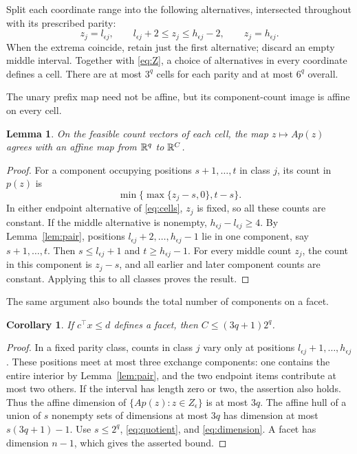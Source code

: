 \documentclass[11pt]{article}
\newtheorem{lemma}[theorem]{Lemma}
\newtheorem{corollary}[theorem]{Corollary}
\begin{document}
Split each coordinate range into the following alternatives, intersected throughout with its prescribed parity:
\begin{equation}\label{eq:cells}
 z_j=l_{\epsilon j},\qquad
 l_{\epsilon j}+2\le z_j\le h_{\epsilon j}-2,\qquad
 z_j=h_{\epsilon j}.
\end{equation}
When the extrema coincide, retain just the first alternative; discard an empty middle interval. Together with \eqref{eq:Z}, a choice of alternatives in every coordinate defines a cell. There are at most $3^q$ cells for each parity and at most $6^q$ overall.

The unary prefix map need not be affine, but its component-count image is affine on every cell.
\begin{lemma}\label{lem:affine}
On the feasible count vectors of each cell, the map $z\mapsto Ap(z)$ agrees with an affine map from $\mathbb R^q$ to $\mathbb R^C$.
\end{lemma}
\begin{proof}
For a component occupying positions $s+1,\ldots,t$ in class $j$, its count in $p(z)$ is
\[
 \min\{\max\{z_j-s,0\},t-s\}.
\]
In either endpoint alternative of \eqref{eq:cells}, $z_j$ is fixed, so all these counts are constant. If the middle alternative is nonempty, $h_{\epsilon j}-l_{\epsilon j}\ge4$. By Lemma~\ref{lem:pair}, positions $l_{\epsilon j}+2,\ldots,h_{\epsilon j}-1$ lie in one component, say $s+1,\ldots,t$. Then $s\le l_{\epsilon j}+1$ and $t\ge h_{\epsilon j}-1$. For every middle count $z_j$, the count in this component is $z_j-s$, and all earlier and later component counts are constant. Applying this to all classes proves the result.
\end{proof}

The same argument also bounds the total number of components on a facet.
\begin{corollary}\label{cor:C}
If $c^\top x\le d$ defines a facet, then $C\le(3q+1)2^q$.
\end{corollary}
\begin{proof}
In a fixed parity class, counts in class $j$ vary only at positions $l_{\epsilon j}+1,\ldots,h_{\epsilon j}$. These positions meet at most three exchange components: one contains the entire interior by Lemma~\ref{lem:pair}, and the two endpoint items contribute at most two others. If the interval has length zero or two, the assertion also holds. Thus the affine dimension of $\{Ap(z):z\in Z_\epsilon\}$ is at most $3q$. The affine hull of a union of $s$ nonempty sets of dimensions at most $3q$ has dimension at most $s(3q+1)-1$. Use $s\le2^q$, \eqref{eq:quotient}, and \eqref{eq:dimension}. A facet has dimension $n-1$, which gives the asserted bound.
\end{proof}
\end{document}
